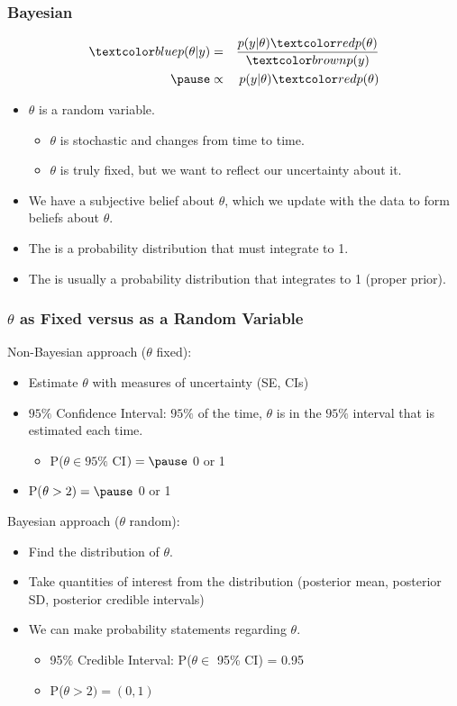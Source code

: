 \documentclass[handout]{beamer}
\begin{document}
\begin{frame}
\frametitle{Bayesian}
\pause
\begin{eqnarray*}
\blue{p(\theta | y)} &=& \frac{p(y | \theta) \red{p(\theta)}
}{\brown{p(y)}} \\
\pause
&\propto& p(y | \theta) \red{p(\theta)}
\end{eqnarray*}
\pause
\begin{itemize}
\item $\theta$ is a random variable.
\pause
\begin{itemize}
\item $\theta$ is stochastic and changes from time to time.
\pause
\item $\theta$ is truly fixed, but we want to reflect our uncertainty
about it.
\end{itemize}
\pause
\item We have a  subjective belief about $\theta$, which we
update with the data to form  beliefs about $\theta$.
\pause
\item The  is a probability
distribution that must integrate to 1.
\pause
\item The  is usually a probability distribution that
integrates to 1 (proper prior). 
\end{itemize}
\end{frame}

\begin{frame}
\frametitle{$\theta$ as Fixed versus as a Random Variable}
\pause
Non-Bayesian approach ($\theta$ fixed):
\pause
\begin{itemize}
\item Estimate $\theta$ with measures of uncertainty (SE, CIs)
\pause
\item $95\%$ Confidence Interval: $95\%$ of the time, $\theta$ is in the
$95\%$ interval that is estimated each time.
\begin{itemize}
\pause
\item P($\theta \in 95\%$ CI$) = \pause$ 0 or 1  
\end{itemize}
\pause
\item P($\theta > 2) = \pause$ 0 or 1
\end{itemize}
\pause
\bigskip
Bayesian approach ($\theta$ random):
\pause
\begin{itemize}
\item Find the  distribution of $\theta$.
\pause
\item Take quantities of interest from the distribution (posterior
mean, posterior SD, posterior credible intervals)
\pause
\item We can make probability statements regarding $\theta$.
\pause
\begin{itemize}
\item 95\% Credible Interval: \pause P($\theta \in$ 95\% CI) = 0.95
\pause
\item P($\theta > 2) = (0,1)$
\end{itemize} 
\end{itemize}
\end{frame}
\end{document}
